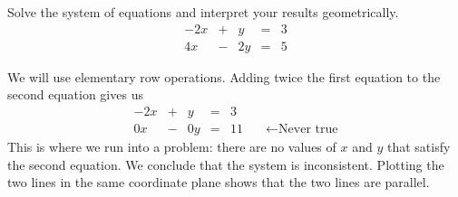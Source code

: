 \documentclass{ximera}
\begin{document}
\begin{example}\label{ex:systwoeqs2} Solve the system of equations and interpret your results geometrically.
$$\begin{array}{ccccc}
      -2x & +&y&= &3 \\
	 4x& -&2y&=&5
    \end{array}$$
\begin{explanation}
We will use elementary row operations.  Adding twice the first equation to the second equation gives us
$$\begin{array}{cccccc}
      -2x & +&y&= &3& \\
	 0x& -&0y&=&11&\quad\leftarrow\mbox{Never true}
    \end{array}$$
This is where we run into a problem: there are no values of $x$ and $y$ that satisfy the second equation.  We conclude that the system is inconsistent.  Plotting the two lines in the same coordinate plane shows that the two lines are parallel.  
    \begin{center}
\end{center}
\end{explanation}
\end{example}
\end{document}
